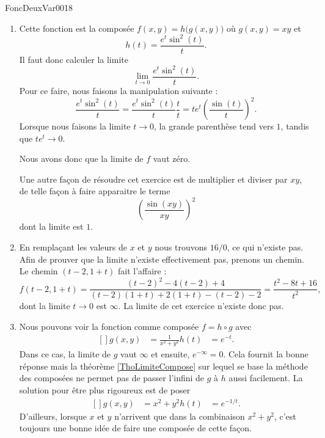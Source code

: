 \begin{corrige}{FoncDeuxVar0018}
\begin{enumerate}
		\item	%
			Cette fonction est la composée $f(x,y)=h\big( g(x,y) \big)$ où $g(x,y)=xy$ et
			\begin{equation}
				h(t)=\frac{  e^{t}\sin^2(t) }{ t }.
			\end{equation}
			Il faut donc calculer la limite
			\begin{equation}
				\lim_{t\to 0}\frac{  e^{t}\sin^2(t) }{ t }.
			\end{equation}
			Pour ce faire, nous faisons la manipulation suivante :
			\begin{equation}
				\frac{  e^{t}\sin^2(t) }{ t }=\frac{  e^{t}\sin^2(t) }{ t }\frac{ t }{ t }=t e^{t}\left( \frac{ \sin(t) }{ t } \right)^2.
			\end{equation}
			Lorsque nous faisons la limite $t\to 0$, la grande parenthèse tend vers $1$, tandis que $t e^{t}\to 0$.

			Nous avons donc que la limite de $f$ vaut zéro.

			Une autre façon de résoudre cet exercice est de multiplier et diviser par $xy$, de telle façon à faire apparaitre le terme
			\begin{equation}
				\left( \frac{ \sin(xy) }{ xy } \right)^2
			\end{equation}
			dont la limite est $1$.
		\item	%
			En remplaçant les valeurs de $x$ et $y$ nous trouvons $16/0$, ce qui n'existe pas. Afin de prouver que la limite n'existe effectivement pas, prenons un chemin. Le chemin $(t-2,1+t)$ fait l'affaire :
			\begin{equation}
				f(t-2,1+t)=\frac{ (t-2)^2-4(t-2)+4 }{ (t-2)(1+t)+2(1+t)-(t-2)-2 }=\frac{ t^2-8t+16 }{ t^2 },
			\end{equation}
			dont la limite $t\to 0$ est $\infty$. La limite de cet exercice n'existe donc pas.
		\item	%
			Nous pouvons voir la fonction comme composée $f=h\circ g$ avec
			\begin{equation}
				\begin{aligned}[]
					g(x,y)&=\frac{1}{ x^2+y^2 }
					h(t)&= e^{-t}.
				\end{aligned}
			\end{equation}
			Dans ce cas, la limite de $g$ vaut $\infty$ et ensuite, $ e^{-\infty}=0$. Cela fournit la bonne réponse mais la théorème \ref{ThoLimiteCompose} sur lequel se base la méthode des composées ne permet pas de passer l'infini de $g$ à $h$ aussi facilement. La solution pour être plus rigoureux est de poser
			\begin{equation}
				\begin{aligned}[]
					g(x,y)&=x^2+y^2
					h(t)&= e^{-1/t}.
				\end{aligned}
			\end{equation}
			D'ailleurs, lorsque $x$ et $y$ n'arrivent que dans la combinaison $x^2+y^2$, c'est toujours une bonne idée de faire une composée de cette façon.


\end{enumerate}
\end{corrige}
